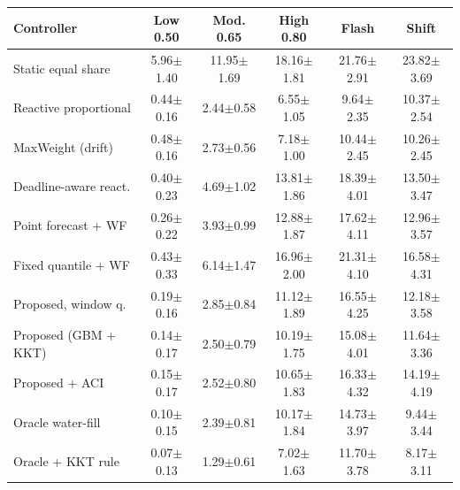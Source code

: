 \begin{tabular}{lccccc}
\hline
Controller & Low 0.50 & Mod. 0.65 & High 0.80 & Flash & Shift \\
\hline
Static equal share & 5.96$\pm$1.40 & 11.95$\pm$1.69 & 18.16$\pm$1.81 & 21.76$\pm$2.91 & 23.82$\pm$3.69 \\
Reactive proportional & 0.44$\pm$0.16 & 2.44$\pm$0.58 & 6.55$\pm$1.05 & 9.64$\pm$2.35 & 10.37$\pm$2.54 \\
MaxWeight (drift) & 0.48$\pm$0.16 & 2.73$\pm$0.56 & 7.18$\pm$1.00 & 10.44$\pm$2.45 & 10.26$\pm$2.45 \\
Deadline-aware react. & 0.40$\pm$0.23 & 4.69$\pm$1.02 & 13.81$\pm$1.86 & 18.39$\pm$4.01 & 13.50$\pm$3.47 \\
Point forecast + WF & 0.26$\pm$0.22 & 3.93$\pm$0.99 & 12.88$\pm$1.87 & 17.62$\pm$4.11 & 12.96$\pm$3.57 \\
Fixed quantile + WF & 0.43$\pm$0.33 & 6.14$\pm$1.47 & 16.96$\pm$2.00 & 21.31$\pm$4.10 & 16.58$\pm$4.31 \\
Proposed, window q. & 0.19$\pm$0.16 & 2.85$\pm$0.84 & 11.12$\pm$1.89 & 16.55$\pm$4.25 & 12.18$\pm$3.58 \\
Proposed (GBM + KKT) & 0.14$\pm$0.17 & 2.50$\pm$0.79 & 10.19$\pm$1.75 & 15.08$\pm$4.01 & 11.64$\pm$3.36 \\
Proposed + ACI & 0.15$\pm$0.17 & 2.52$\pm$0.80 & 10.65$\pm$1.83 & 16.33$\pm$4.32 & 14.19$\pm$4.19 \\
\hline
Oracle water-fill & 0.10$\pm$0.15 & 2.39$\pm$0.81 & 10.17$\pm$1.84 & 14.73$\pm$3.97 & 9.44$\pm$3.44 \\
Oracle + KKT rule & 0.07$\pm$0.13 & 1.29$\pm$0.61 & 7.02$\pm$1.63 & 11.70$\pm$3.78 & 8.17$\pm$3.11 \\
\hline
\end{tabular}
